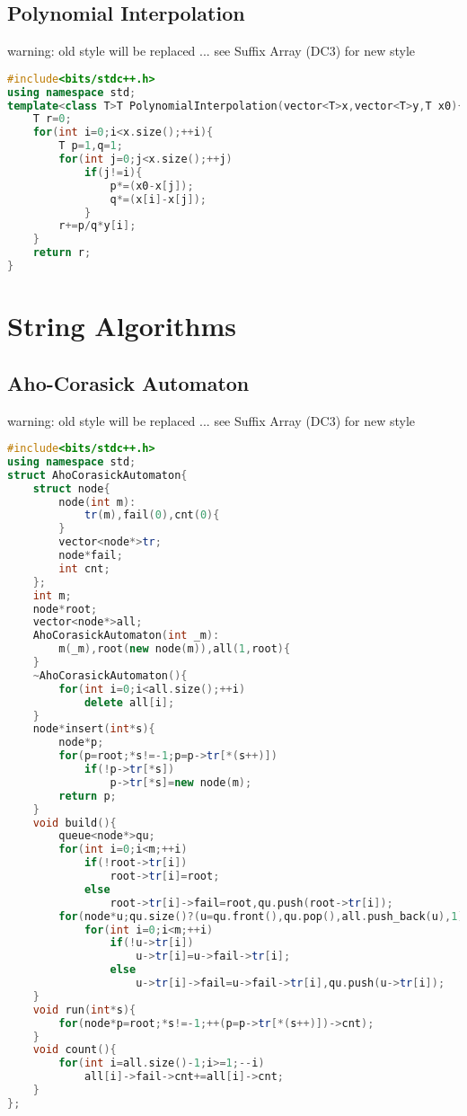 \documentclass{book}
\begin{document}
\section{Polynomial Interpolation}
warning: old style will be replaced ... see Suffix Array (DC3) for new style\begin{lstlisting}[language=C++,title={Polynomial Interpolation.hpp (372 bytes, 15 lines)}]
#include<bits/stdc++.h>
using namespace std;
template<class T>T PolynomialInterpolation(vector<T>x,vector<T>y,T x0){
    T r=0;
    for(int i=0;i<x.size();++i){
        T p=1,q=1;
        for(int j=0;j<x.size();++j)
            if(j!=i){
                p*=(x0-x[j]);
                q*=(x[i]-x[j]);
            }
        r+=p/q*y[i];
    }
    return r;
}
\end{lstlisting}
\chapter{String Algorithms}
\newpage
{}
\section{Aho-Corasick Automaton}
warning: old style will be replaced ... see Suffix Array (DC3) for new style\begin{lstlisting}[language=C++,title={Aho-Corasick Automaton.hpp (1369 bytes, 50 lines)}]
#include<bits/stdc++.h>
using namespace std;
struct AhoCorasickAutomaton{
    struct node{
        node(int m):
            tr(m),fail(0),cnt(0){
        }
        vector<node*>tr;
        node*fail;
        int cnt;
    };
    int m;
    node*root;
    vector<node*>all;
    AhoCorasickAutomaton(int _m):
        m(_m),root(new node(m)),all(1,root){
    }
    ~AhoCorasickAutomaton(){
        for(int i=0;i<all.size();++i)
            delete all[i];
    }
    node*insert(int*s){
        node*p;
        for(p=root;*s!=-1;p=p->tr[*(s++)])
            if(!p->tr[*s])
                p->tr[*s]=new node(m);
        return p;
    }
    void build(){
        queue<node*>qu;
        for(int i=0;i<m;++i)
            if(!root->tr[i])
                root->tr[i]=root;
            else
                root->tr[i]->fail=root,qu.push(root->tr[i]);
        for(node*u;qu.size()?(u=qu.front(),qu.pop(),all.push_back(u),1):0;)
            for(int i=0;i<m;++i)
                if(!u->tr[i])
                    u->tr[i]=u->fail->tr[i];
                else
                    u->tr[i]->fail=u->fail->tr[i],qu.push(u->tr[i]);
    }
    void run(int*s){
        for(node*p=root;*s!=-1;++(p=p->tr[*(s++)])->cnt);
    }
    void count(){
        for(int i=all.size()-1;i>=1;--i)
            all[i]->fail->cnt+=all[i]->cnt;
    }
};
\end{lstlisting}
\end{document}
